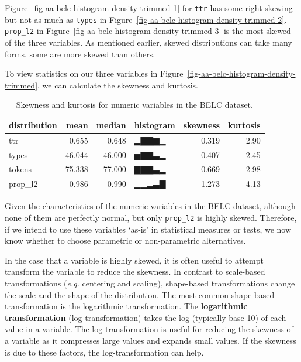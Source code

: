 \documentclass[
  letterpaper,
  DIV=11,
  numbers=noendperiod]{scrreport}
\theoremstyle{definition}
\theoremstyle{remark}
\begin{document}
Figure~\ref{fig-aa-belc-histogram-density-trimmed-1} for \texttt{ttr}
has some right skewing but not as much as \texttt{types} in
Figure~\ref{fig-aa-belc-histogram-density-trimmed-2}. \texttt{prop\_l2}
in Figure~\ref{fig-aa-belc-histogram-density-trimmed-3} is the most
skewed of the three variables. As mentioned earlier, skewed
distributions can take many forms, some are more skewed than others.

To view statistics on our three variables in
Figure~\ref{fig-aa-belc-histogram-density-trimmed}, we can calculate the
skewness and kurtosis.

\hypertarget{tbl-aa-belc-skewness-kurtosis}{}
\begin{table}
\caption{\label{tbl-aa-belc-skewness-kurtosis}Skewness and kurtosis for numeric variables in the BELC dataset. }\tabularnewline

\centering
\begin{tabular}{l|r|r|l|r|r}
\hline
distribution & mean & median & histogram & skewness & kurtosis\\
\hline
ttr & 0.655 & 0.648 & ▂▇▇▆▁ & 0.319 & 2.90\\
\hline
types & 46.044 & 46.000 & ▅▇▇▃▂ & 0.407 & 2.45\\
\hline
tokens & 75.338 & 77.000 & ▇▇▇▃▂ & 0.669 & 2.98\\
\hline
prop\_l2 & 0.986 & 0.990 & ▁▁▂▃▇ & -1.273 & 4.13\\
\hline
\end{tabular}
\end{table}

Given the characteristics of the numeric variables in the BELC dataset,
although none of them are perfectly normal, but only \texttt{prop\_l2}
is highly skewed. Therefore, if we intend to use these variables `as-is'
in statistical measures or tests, we now know whether to choose
parametric or non-parametric alternatives.

In the case that a variable is highly skewed, it is often useful to
attempt transform the variable to reduce the skewness. In contrast to
scale-based transformations (\emph{e.g.} centering and scaling),
shape-based transformations change the scale and the shape of the
distribution. The most common shape-based transformation is the
logarithmic transformation. The \textbf{logarithmic transformation}
(log-transformation) takes the log (typically base 10) of each value in
a variable. The log-transformation is useful for reducing the skewness
of a variable as it compresses large values and expands small values. If
the skewness is due to these factors, the log-transformation can help.
\end{document}
